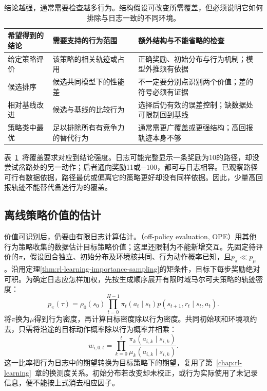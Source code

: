 \begin{table}[htbp]
  \centering
  \small
  \begin{tabularx}{\linewidth}{p{26mm}XX}
    \toprule
    希望得到的结论 & 需要支持的行为范围 & 额外结构与不能省略的检查 \\
    \midrule
    给定策略评价 & 该策略的相关轨迹或占用 & 正确奖励、初始分布与行为机制；模型外推须有依据 \\
    候选排序 & 候选共同模型下的性能差 & 不一定要分别点识别两个价值；差的符号必须有证据 \\
    相对基线改进 & 候选与基线的比较行为 & 选择后仍有效的误差控制；缺数据处可限制回到基线 \\
    策略类中最优 & 足以排除所有有竞争力的替代行为 & 通常需更广覆盖或更强结构；高回报轨迹本身不够 \\
    \bottomrule
  \end{tabularx}
  \caption{结论越强，通常需要检查越多行为。结构假设可改变所需覆盖，但必须说明它如何排除与日志一致的不同环境。}
  \label{tab:rl-information-claims}
\end{table}

表~\ref{tab:rl-information-claims}~将覆盖要求对应到结论强度。日志可能完整显示一条奖励为10的路径，却没尝试岔路处的另一动作；后者通向奖励11或$-100$，都可与日志相容。已观察路径可行有数据依据，路径最优或偏离它的策略更好却没有同样依据。因此，少量高回报轨迹不能替代备选行为的覆盖。

\subsection{离线策略价值的估计}
\label{sec:rl-information-estimators}

价值可识别后，仍要由有限日志计算估计。（off-policy evaluation, OPE）用其他行为策略收集的数据估计目标策略价值；这里还限制为不能新增交互。先固定待评价的$\pi$，假设回合独立、初始分布及环境核共同、行为动作概率已知，且$p_\pi\ll p_\mu$。沿用定理\ref{thm:rl-learning-importance-sampling}的矩条件，目标下每步奖励绝对可积。为确定日志应怎样加权，先按生成顺序展开有限时域马尔可夫策略的轨迹密度：
\[
  p_\pi(\tau)=\rho_0(s_0)
       \prod_{t=0}^{H-1}
       \pi_t(a_t\mid s_t)p(s_{t+1},r_t\mid s_t,a_t).
\]
将$\pi$换为$\mu$得到行为密度，再计算目标密度除以行为密度。共同初始项和环境项约去，只需将沿途的目标动作概率除以行为概率并相乘：
\begin{equation}
  \label{eq:rl-information-weights}
  w_{i,0:t}=\prod_{k=0}^{t}
       \frac{\pi_k(a_{i,k}\mid s_{i,k})}
            {\mu_k(a_{i,k}\mid s_{i,k})}.
\end{equation}
这一比率把行为日志中的期望转换为目标策略下的期望，复用了第~\ref{chap:rl-learning}~章的换测度关系。初始分布若改变却未校正，或行为实际使用了未记录信息，便不能按上式消去相应因子。

